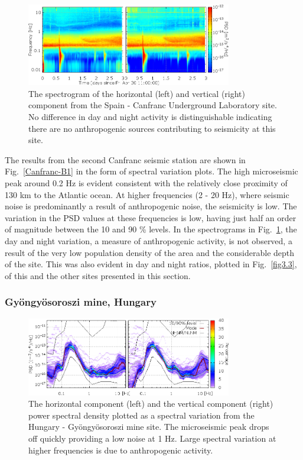 \begin{figure}[h]
	\begin{center}
		\includegraphics[width=0.8\textwidth]{./Sec_SiteInfra/Figures/Canfranc-B_multiplot2}
		\caption{The spectrogram of the horizontal (left) and vertical (right) component from the Spain - Canfranc Underground Laboratory site. No difference in day and night activity is distinguishable indicating there are no anthropogenic sources contributing to seismicity at this site. }
		\label{Canfranc-B2}
	\end{center}
\end{figure}

The results from the second Canfranc seismic station are shown in Fig.~\ref{Canfranc-B1} in the form of spectral variation plots. The high microseismic peak around 0.2 Hz is evident consistent with the relatively close proximity of 130 km to the Atlantic ocean. At higher frequencies (2 - 20 Hz), where seismic noise is predominantly a result of anthropogenic noise, the seismicity is low. The variation in the PSD values at these frequencies is low, having just half an order of magnitude between the 10 and 90 \% levels. In the spectrograms in Fig.~\ref{Canfranc-B2}, the day and night variation, a measure of anthropogenic activity, is not observed, a result of the very low population density of the area and the considerable depth of the site. This was also evident in day and night ratios, plotted in Fig.~\ref{fig3.3}, of this and the other sites presented in this section.
 
\FloatBarrier
\subsubsection*{Gy\"ongy\"osoroszi mine, Hungary}
\begin{figure}[t]
	\begin{center}
		\includegraphics[width=0.8\textwidth]{./Sec_SiteInfra/Figures/Hung-A_multiplot1}
		\caption{The horizontal component (left) and the vertical component (right) power spectral density plotted as a spectral variation from the Hungary - Gy\"ongy\"osoroszi mine site. The microseismic peak drops off quickly providing a low noise at 1 Hz. Large spectral variation at higher frequencies is due to anthropogenic activity.}
		\label{fig:Hung-A_multiplot1}
		\end{center}
\end{figure}

